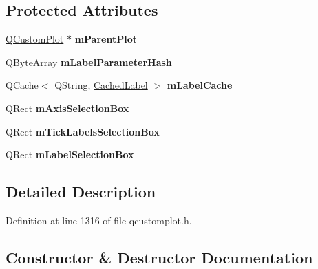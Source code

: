 \subsection*{Protected Attributes}
\begin{DoxyCompactItemize}
\item 
\mbox{\label{class_q_c_p_axis_painter_private_a882029a5f2d4abd71289d415c9b90a28}} 
\hyperlink{class_q_custom_plot}{Q\+Custom\+Plot} $\ast$ {\bfseries m\+Parent\+Plot}
\item 
\mbox{\label{class_q_c_p_axis_painter_private_aab8be59df22ed4e43e3a6d511cbc466a}} 
Q\+Byte\+Array {\bfseries m\+Label\+Parameter\+Hash}
\item 
\mbox{\label{class_q_c_p_axis_painter_private_a07ac270ea0c0ae084debd48d6a740e35}} 
Q\+Cache$<$ Q\+String, \hyperlink{struct_q_c_p_axis_painter_private_1_1_cached_label}{Cached\+Label} $>$ {\bfseries m\+Label\+Cache}
\item 
\mbox{\label{class_q_c_p_axis_painter_private_a9d7586f4923994488bdd006415b13f5f}} 
Q\+Rect {\bfseries m\+Axis\+Selection\+Box}
\item 
\mbox{\label{class_q_c_p_axis_painter_private_a0adaf5f1d89be0f32dc4a904d157e5a9}} 
Q\+Rect {\bfseries m\+Tick\+Labels\+Selection\+Box}
\item 
\mbox{\label{class_q_c_p_axis_painter_private_abac9a47048d537f72ca147b6f29d30f1}} 
Q\+Rect {\bfseries m\+Label\+Selection\+Box}
\end{DoxyCompactItemize}


\subsection{Detailed Description}


Definition at line 1316 of file qcustomplot.\+h.



\subsection{Constructor \& Destructor Documentation}
\mbox{\label{class_q_c_p_axis_painter_private_a0f14aa5c4aa83dbcd68984a7c73bf94f}} 
